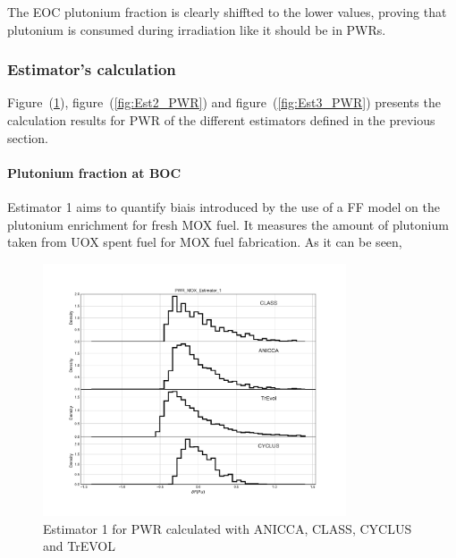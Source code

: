 The EOC plutonium fraction is clearly shiffted to the lower values, proving that plutonium is consumed during irradiation like it should be in PWRs.   

\subsubsection{Estimator's calculation}

Figure~(\ref{fig:Est1_PWR}), figure~(\ref{fig:Est2_PWR}) and figure~(\ref{fig:Est3_PWR}) presents the calculation results for PWR of the different estimators defined in the previous section. 

\paragraph{Plutonium fraction at BOC}
Estimator 1 aims to quantify biais introduced by the use of a FF model on the plutonium enrichment for fresh MOX fuel. It measures the amount of plutonium taken from UOX spent fuel for MOX fuel fabrication. As it can be seen, 

\begin{figure}[h]
	\begin{center}
		\includegraphics[width = 0.8\textwidth]{../../Feature_1/RAW_DATA/FIG/PWR_MOX_Estimator_1.pdf}
		\caption{Estimator 1 for PWR calculated with ANICCA, CLASS, CYCLUS and TrEVOL}
		\label{fig:Est1_PWR}
	\end{center}
\end{figure}

